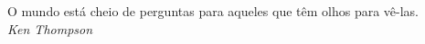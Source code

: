 
\begin{epigrafe}

\noindent
O mundo está cheio de perguntas para aqueles que têm olhos para vê-las.\\
\hspace*{\fill} \textit{Ken Thompson}

\end{epigrafe}